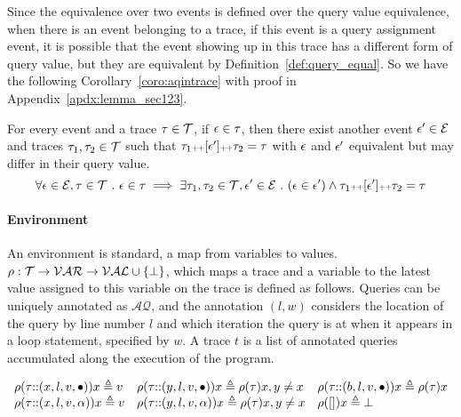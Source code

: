   Since the equivalence over two events is defined over the query value equivalence, 
  when there is an event belonging to a trace, 
  if this event is a query assignment event, 
  it is possible that 
  the event showing up in this trace has a different form of query value, 
  but they are equivalent by Definition~\ref{def:query_equal}.
  So we have the following Corollary~\ref{coro:aqintrace} with proof in Appendix~\ref{apdx:lemma_sec123}.
  \begin{coro}
  \label{coro:aqintrace}
  For every event and a trace $\mathtt{\tau} \in \mathcal{T}$,
  if $\mathtt{\epsilon} \in \mathtt{\tau}$, 
  then there exist another event $\mathtt{\epsilon}' \in \mathcal{E}$ and traces $\mathtt{\tau}_1, \mathtt{\tau}_2 \in \mathcal{T}$
  such that $\mathtt{\tau}_1 {\scriptscriptstyle ++} [\mathtt{\epsilon}'] {\scriptscriptstyle ++} \mathtt{\tau}_2 = \mathtt{\tau} $
  with 
  $\mathtt{\epsilon}$ and $\mathtt{\epsilon}'$ equivalent but may differ in their query value.
  \[
    \forall \mathtt{\epsilon} \in \mathcal{E}, \mathtt{\tau} \in \mathcal{T} ~.~ 
  \mathtt{\epsilon} \in \mathtt{\tau} \implies \exists \mathtt{\tau}_1, \mathtt{\tau}_2 \in \mathcal{T}, 
  \mathtt{\epsilon}' \in \mathcal{E} ~.~ (\mathtt{\epsilon} \in \mathtt{\epsilon}') \land \mathtt{\tau}_1 {\scriptscriptstyle ++} [\mathtt{\epsilon}'] {\scriptscriptstyle ++} \mathtt{\tau}_2 = \mathtt{\tau}  
  \]
  \end{coro}
%  
\paragraph{Environment}
An environment is standard, a map from variables to values.
$\rho : {\mathcal{T}}  \to \mathcal{VAR} \to \mathcal{VAL} \cup \{\bot\}$, 
which maps a trace and a variable to the latest value assigned to this variable on the trace is defined as follows.
Queries can be uniquely annotated as $\mathcal{AQ}$, and the annotation $(l,w)$ considers the location of the query by line number $l$ and which 
iteration the query is at when it appears in a loop statement, specified by $w$. A trace $t$ is a list of annotated queries accumulated along the execution of the program. 

\[
\begin{array}{lll}
\rho(\mathtt{\tau}  {\small ::} (x, l, v, \bullet)) x \triangleq v
&
\rho(\mathtt{\tau} {\small ::} (y, l, v, \bullet)) x \triangleq \rho(\mathtt{\tau}) x, y \neq x
&
\rho(\mathtt{\tau} {\small ::} (b, l, v, \bullet)) x \triangleq \rho(\mathtt{\tau}) x
\\
\rho(\mathtt{\tau} {\small ::} (x, l, v, \alpha)) x \triangleq v
&
\rho(\mathtt{\tau} {\small ::} (y, l, v, \alpha)) x \triangleq \rho(\mathtt{\tau}) x, y \neq x
&
\rho({[]} ) x \triangleq \bot
\end{array}
\]


